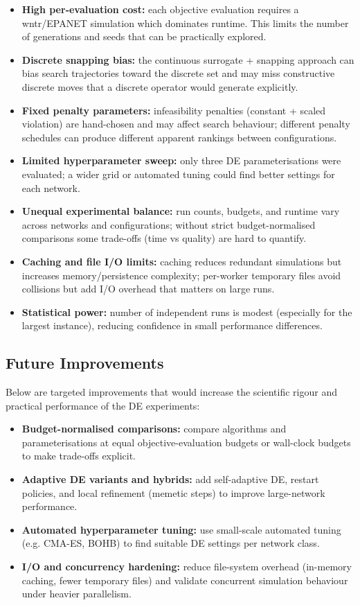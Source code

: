 \documentclass[12pt, a4paper]{article}
\begin{document}
\begin{itemize}
	\item \textbf{High per-evaluation cost:} each objective evaluation requires a wntr/EPANET simulation which dominates runtime. This limits the number of generations and seeds that can be practically explored.
	\item \textbf{Discrete snapping bias:} the continuous surrogate + snapping approach can bias search trajectories toward the discrete set and may miss constructive discrete moves that a discrete operator would generate explicitly.
	\item \textbf{Fixed penalty parameters:} infeasibility penalties (constant + scaled violation) are hand-chosen and may affect search behaviour; different penalty schedules can produce different apparent rankings between configurations.
	\item \textbf{Limited hyperparameter sweep:} only three DE parameterisations were evaluated; a wider grid or automated tuning could find better settings for each network.
	\item \textbf{Unequal experimental balance:} run counts, budgets, and runtime vary across networks and configurations; without strict budget-normalised comparisons some trade-offs (time vs quality) are hard to quantify.
	\item \textbf{Caching and file I/O limits:} caching reduces redundant simulations but increases memory/persistence complexity; per-worker temporary files avoid collisions but add I/O overhead that matters on large runs.
	\item \textbf{Statistical power:} number of independent runs is modest (especially for the largest instance), reducing confidence in small performance differences.
\end{itemize}

\subsection{Future Improvements}

Below are targeted improvements that would increase the scientific rigour and practical performance of the DE experiments:

\begin{itemize}
	\item \textbf{Budget-normalised comparisons:} compare algorithms and parameterisations at equal objective-evaluation budgets or wall-clock budgets to make trade-offs explicit.
	\item \textbf{Adaptive DE variants and hybrids:} add self-adaptive DE, restart policies, and local refinement (memetic steps) to improve large-network performance.
	\item \textbf{Automated hyperparameter tuning:} use small-scale automated tuning (e.g. CMA-ES, BOHB) to find suitable DE settings per network class.
	\item \textbf{I/O and concurrency hardening:} reduce file-system overhead (in-memory caching, fewer temporary files) and validate concurrent simulation behaviour under heavier parallelism.
\end{itemize}
\end{document}

